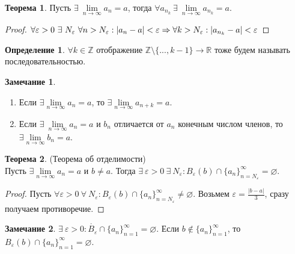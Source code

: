 \documentclass[a4paper, 12pt]{article}
\newcommand{\Z}{\mathbb{Z}}
\newcommand{\R}{\mathbb{R}}
\renewcommand{\epsilon}{\varepsilon}
\renewcommand{\emptyset}{\varnothing}
\newcommand\tab[1][.5cm]{\hspace*{#1}}
\newcommand{\lims}{\lim\limits_{n\to \infty}}
\theoremstyle{definition}
\newtheorem*{definition}{Определение}
\newtheorem*{theorem}{Теорема}
\newtheorem*{comm}{Замечание}
\begin{document}
        \begin{theorem}
            Пусть $\exists\ \lims a_n=a$, тогда $\forall a_{n_k}\ \exists\ \lims a_{n_k}=a$.
        \end{theorem} 
        \begin{proof}
            $\forall \epsilon>0\ \exists\ N_{\epsilon}\ \forall n>N_{\epsilon}: |a_n-a|<\epsilon \Rightarrow \forall k>N_{\epsilon}:\\ |a_{n_k}-a|<\epsilon$
        \end{proof} 
        \begin{definition}
            $\forall k\in \Z$ отображение $\Z \setminus \{..., k-1\} \to \R$ тоже будем называть последовательностью.
        \end{definition} 
        \begin{comm}\tab
            \begin{enumerate}
                \item Если $\exists \lims a_n=a$, то $\exists \lims a_{n+k}=a$.
                \item Если $\exists\ \lims a_n=a$ и $b_n$ отличается от $a_n$ конечным числом членов, то $\exists \lims b_n=a$.
            \end{enumerate}
        \end{comm} 
        \begin{theorem} (Теорема об отделимости)\\
            Пусть $\exists \lims a_n=a$ и $b\ne a$. Тогда $\exists\ \epsilon>0\ \exists\ N_{\epsilon}: B_{\epsilon}(b)\cap \{a_n\}_{n=N_{\epsilon}}^{\infty}=\emptyset$.
        \end{theorem} 
        \begin{proof}
            Пусть $\forall \epsilon>0\ \forall \ N_{\epsilon}: B_{\epsilon}(b)\cap \{a_n\}_{n=N_{\epsilon}}^{\infty}\ne \emptyset$. Возьмем $\epsilon = \frac{|b-a|}{3}$, сразу получаем противоречие.
        \end{proof} 
        \begin{comm}
            $\exists\ \epsilon>0: \mathring{B_{\epsilon}}\cap \{a_n\}_{n=1}^{\infty}=\emptyset$. Если $b\notin \{a_n\}_{n=1}^{\infty}$, то\\
            $B_{\epsilon}(b)\cap\{a_n\}_{n=1}^{\infty}=\emptyset$.
        \end{comm} 
\end{document}
